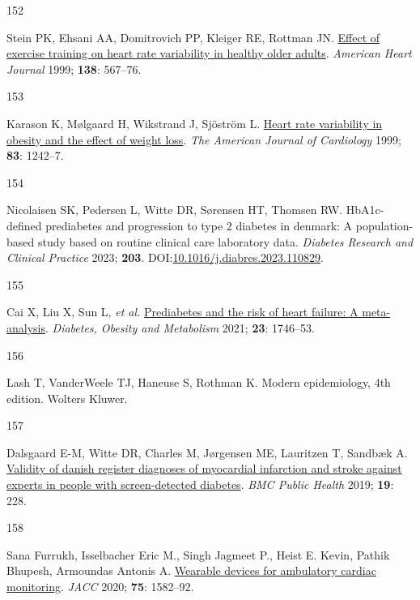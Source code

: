 \documentclass[
  a4paper,
  headsepline=true,
  open=left]{scrbook}
\newlength{\cslhangindent}
\newlength{\csllabelwidth}
\newlength{\cslentryspacingunit} %
\newenvironment{CSLReferences}[2] %
 {%
  \setlength{\parindent}{0pt}
  \ifodd #1
  \let\oldpar\par
  \def\par{\hangindent=\cslhangindent\oldpar}
  \fi
  \setlength{\parskip}{#2\cslentryspacingunit}
 }%
 {}
\newcommand{\CSLLeftMargin}[1]{\parbox[t]{\csllabelwidth}{#1}}
\newcommand{\CSLRightInline}[1]{\parbox[t]{\linewidth - \csllabelwidth}{#1}\break}
\begin{document}
\begin{CSLReferences}{0}{0}
\leavevmode{}%
\CSLLeftMargin{152 }%
\CSLRightInline{Stein PK, Ehsani AA, Domitrovich PP, Kleiger RE, Rottman
JN. \href{https://doi.org/10.1016/S0002-8703(99)70162-6}{Effect of
exercise training on heart rate variability in healthy older adults}.
\emph{American Heart Journal} 1999; \textbf{138}: 567--76.}

\leavevmode{}%
\CSLLeftMargin{153 }%
\CSLRightInline{Karason K, Mølgaard H, Wikstrand J, Sjöström L.
\href{https://doi.org/10.1016/S0002-9149(99)00066-1}{Heart rate
variability in obesity and the effect of weight loss}. \emph{The
American Journal of Cardiology} 1999; \textbf{83}: 1242--7.}

\leavevmode{}%
\CSLLeftMargin{154 }%
\CSLRightInline{Nicolaisen SK, Pedersen L, Witte DR, Sørensen HT,
Thomsen RW. HbA1c-defined prediabetes and progression to type 2 diabetes
in denmark: A population-based study based on routine clinical care
laboratory data. \emph{Diabetes Research and Clinical Practice} 2023;
\textbf{203}.
DOI:\href{https://doi.org/10.1016/j.diabres.2023.110829}{10.1016/j.diabres.2023.110829}.}

\leavevmode{}%
\CSLLeftMargin{155 }%
\CSLRightInline{Cai X, Liu X, Sun L, \emph{et al.}
\href{https://doi.org/10.1111/dom.14388}{Prediabetes and the risk of
heart failure: A meta-analysis}. \emph{Diabetes, Obesity and Metabolism}
2021; \textbf{23}: 1746--53.}

\leavevmode{}%
\CSLLeftMargin{156 }%
\CSLRightInline{Lash T, VanderWeele TJ, Haneuse S, Rothman K. Modern
epidemiology, 4th edition. Wolters Kluwer.}

\leavevmode{}%
\CSLLeftMargin{157 }%
\CSLRightInline{Dalsgaard E-M, Witte DR, Charles M, Jørgensen ME,
Lauritzen T, Sandbæk A.
\href{https://doi.org/10.1186/s12889-019-6549-z}{Validity of danish
register diagnoses of myocardial infarction and stroke against experts
in people with screen-detected diabetes}. \emph{BMC Public Health} 2019;
\textbf{19}: 228.}

\leavevmode{}%
\CSLLeftMargin{158 }%
\CSLRightInline{Sana Furrukh, Isselbacher Eric M., Singh Jagmeet P.,
Heist E. Kevin, Pathik Bhupesh, Armoundas Antonis A.
\href{https://doi.org/10.1016/j.jacc.2020.01.046}{Wearable devices for
ambulatory cardiac monitoring}. \emph{JACC} 2020; \textbf{75}:
1582--92.}


\end{CSLReferences}
\end{document}
